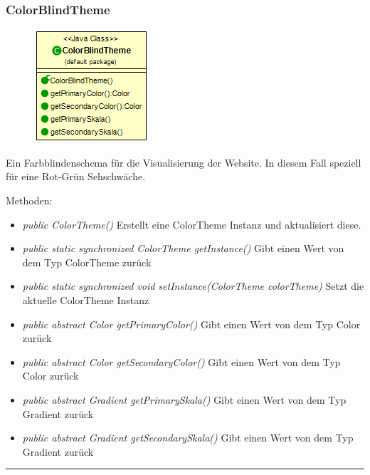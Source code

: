 \subsubsection{ColorBlindTheme}
\begin{minipage}{0.3\textwidth}
\begin{figure}[H]
    {\centering\includegraphics[scale = 0.5
    ]{media/view/theme/ColorBlindTheme_Class.png}}
\end{figure}
\end{minipage} \hfill
\begin{minipage}{0.6\textwidth}
    Ein Farbblindenschema für die Visualisierung der Website. In diesem Fall speziell für eine Rot-Grün Sehschwäche.
\end{minipage}
Methoden: \begin{itemize} [noitemsep]
    \item \emph{public ColorTheme()} Erstellt eine ColorTheme Instanz und aktualisiert diese.
    \item \emph{public static synchronized ColorTheme getInstance()} Gibt einen Wert von dem Typ ColorTheme zurück
    \item \emph{public static synchronized void setInstance(ColorTheme colorTheme)} Setzt die aktuelle ColorTheme Instanz
    \item \emph{public abstract Color getPrimaryColor()} Gibt einen Wert von dem Typ Color zurück
    \item \emph{public abstract Color getSecondaryColor()} Gibt einen Wert von dem Typ Color zurück
    \item \emph{public abstract Gradient getPrimarySkala()} Gibt einen Wert von dem Typ Gradient zurück
    \item \emph{public abstract Gradient getSecondarySkala()}  Gibt einen Wert von dem Typ Gradient zurück
\end{itemize}

\rule{\textwidth}{0.4pt}
